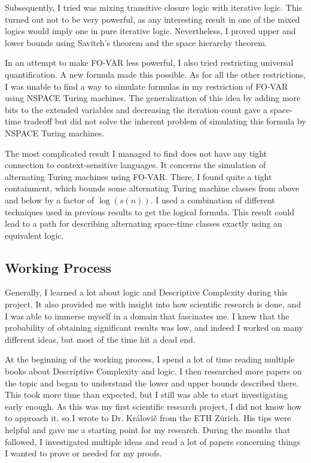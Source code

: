 Subsequently, I tried was mixing transitive closure logic with iterative logic.
This turned out not to be very powerful, as any interesting result in one of the mixed logics would imply one in pure iterative logic.
Nevertheless, I proved upper and lower bounds using Savitch's theorem and the space hierarchy theorem.

In an attempt to make \acs{FO-VAR} less powerful, I also tried restricting universal quantification.
A new formula made this possible.
As for all the other restrictions, I was unable to find a way to simulate formulas in my restriction of \acs{FO-VAR} using \acs{NSPACE} Turing machines.
The generalization of this idea by adding more bits to the extended variables and decreasing the iteration count gave a space-time tradeoff but did not solve the inherent problem of simulating this formula by \acs{NSPACE} Turing machines.

The most complicated result I managed to find does not have any tight connection to context-sensitive languages.
It concerns the simulation of alternating Turing machines using \acs{FO-VAR}\@.
There, I found quite a tight containment, which bounds some alternating Turing machine classes from above and below by a factor of $\log(s(n))$.
I used a combination of different techniques used in previous results to get the logical formula.
This result could lead to a path for describing alternating space-time classes exactly using an equivalent logic.

\subsection{Working Process}\label{subsec:working-process}
Generally, I learned a lot about logic and Descriptive Complexity during this project.
It also provided me with insight into how scientific research is done, and I was able to immerse myself in a domain that fascinates me.
I knew that the probability of obtaining significant results was low, and indeed I worked on many different ideas, but most of the time hit a dead end.

At the beginning of the working process, I spend a lot of time reading multiple books about Descriptive Complexity and logic.
I then researched more papers on the topic and began to understand the lower and upper bounds described there.
This took more time than expected, but I still was able to start investigating early enough.
As this was my first scientific research project, I did not know how to approach it, so I wrote to Dr. Královi\v{c} from the ETH Zürich.
His tips were helpful and gave me a starting point for my research.
During the months that followed, I investigated multiple ideas and read a lot of papers concerning things I wanted to prove or needed for my proofs.

